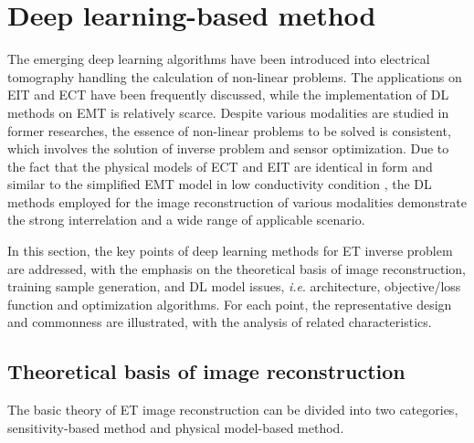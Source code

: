 

%


\section{Deep learning-based method}
\label{sec:Deep learning-based method}

The emerging deep learning algorithms have been introduced into electrical tomography handling the calculation of non-linear problems.
The applications on EIT and ECT have been frequently discussed, while the implementation of DL methods on EMT is relatively scarce.
Despite various modalities are studied in former researches, the essence of non-linear problems to be solved is consistent, which involves the solution of inverse problem and sensor optimization\cite{Smyl2020Optimizing}.
Due to the fact that the physical models of ECT and EIT are identical in form and similar to the simplified EMT model in low conductivity condition \cite{Cao2011Direct}, the DL methods employed for the image reconstruction of various modalities demonstrate the strong interrelation and a wide range of applicable scenario.

In this section, the key points of deep learning methods for ET inverse problem are addressed, with the emphasis on the theoretical basis of image reconstruction, training sample generation, and DL model issues, \emph{i.e}. architecture, objective/loss function and optimization algorithms.
For each point, the representative design and commonness are illustrated, with the analysis of related characteristics.

\subsection{Theoretical basis of image reconstruction}
\label{subsec:Theoretical basis of image reconstruction}

The basic theory of ET image reconstruction can be divided into two categories, sensitivity-based method and physical model-based method.

